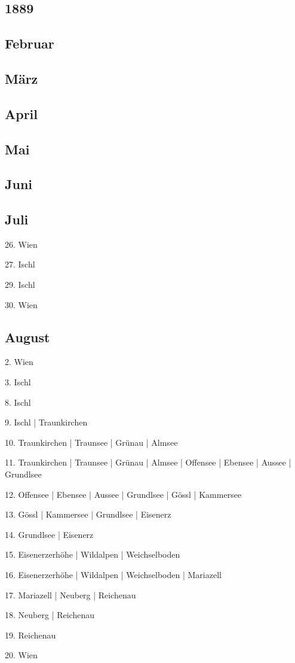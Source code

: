 \documentclass[twoside=false,titlepage=false,open=any, parskip=never, fontsize=10pt, headings=small, chapterprefix=false, appendixprefix=false, DIV=15]{scrbook}
\begin{document}
\begin{multicols}{3}
            \chapter*{1889}
            \section*{Februar}
            \section*{März}
            \section*{April}
            \section*{Mai}
            \section*{Juni}
            \section*{Juli}
            26. Wien\par
            27. Ischl\par
            29. Ischl\par
            30. Wien\par
            \section*{August}
            2. Wien\par
            3. Ischl\par
            8. Ischl\par
            9. Ischl | Traunkirchen\par
            10. Traunkirchen | Traunsee | Grünau | Almsee\par
            11. Traunkirchen | Traunsee | Grünau | Almsee | Offensee | Ebensee | Aussee | Grundlsee\par
            12. Offensee | Ebensee | Aussee | Grundlsee | Gössl | Kammersee\par
            13. Gössl | Kammersee | Grundlsee | Eisenerz\par
            14. Grundlsee | Eisenerz\par
            15. Eisenerzerhöhe | Wildalpen | Weichselboden\par
            16. Eisenerzerhöhe | Wildalpen | Weichselboden | Mariazell\par
            17. Mariazell | Neuberg | Reichenau\par
            18. Neuberg | Reichenau\par
            19. Reichenau\par
            20. Wien\par

\end{multicols}
\end{document}
